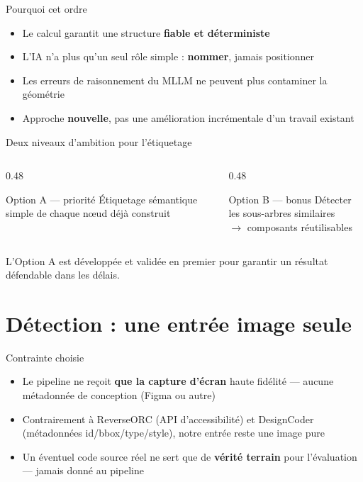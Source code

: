 \documentclass[11pt,aspectratio=169]{beamer}
\begin{document}
\begin{frame}{Pourquoi cet ordre}
  \begin{itemize}
    \item Le calcul garantit une structure \textbf{fiable et déterministe}
    \item L'IA n'a plus qu'un seul rôle simple : \textbf{nommer}, jamais positionner
    \item Les erreurs de raisonnement du MLLM ne peuvent plus contaminer la géométrie
    \item Approche \textbf{nouvelle}, pas une amélioration incrémentale d'un travail existant
  \end{itemize}
\end{frame}

\begin{frame}{Deux niveaux d'ambition pour l'étiquetage}
  \begin{columns}[T,onlytextwidth]
    \begin{column}{0.48\textwidth}
      \begin{block}{Option A --- priorité}
        Étiquetage sémantique simple de chaque nœud déjà construit
      \end{block}
    \end{column}
    \begin{column}{0.48\textwidth}
      \begin{alertblock}{Option B --- bonus}
        Détecter les sous-arbres similaires \\ $\rightarrow$ composants réutilisables
      \end{alertblock}
    \end{column}
  \end{columns}
  \vspace{6mm}
  \small \centering L'Option A est développée et validée en premier pour garantir un résultat défendable dans les délais.
\end{frame}

\section{Détection : une entrée image seule}

\begin{frame}{Contrainte choisie}
  \begin{itemize}
    \item Le pipeline ne reçoit \textbf{que la capture d'écran} haute fidélité --- aucune métadonnée de conception (Figma ou autre)
    \item Contrairement à ReverseORC (API d'accessibilité) et DesignCoder (métadonnées id/bbox/type/style), notre entrée reste une image pure
    \item Un éventuel code source réel ne sert que de \textbf{vérité terrain} pour l'évaluation --- jamais donné au pipeline
  \end{itemize}
\end{frame}
\end{document}
